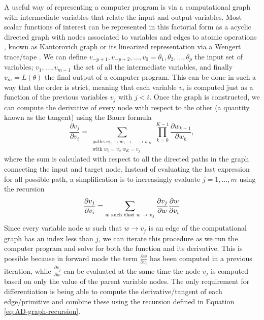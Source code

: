 A useful way of representing a computer program is via a computational graph with intermediate variables that relate the input and output variables. 
Most scalar functions of interest can be represented in this factorial form as a acyclic directed graph with nodes associated to variables and edges to atomic operations \cite{Griewank:2008kh, Griewank_1989}, known as Kantorovich graph \cite{kantorovich1957mathematical} or its linearized representation via a Wengert trace/tape \cite{Wengert_1964, Bauer_1974, Griewank:2008kh}. 
We can define $v_{-p+1}, v_{-p+2}, \ldots, v_0 = \theta_1, \theta_2, \ldots, \theta_p$ the input set of variables; $v_{1}, \ldots, v_{m-1}$ the set of all the intermediate variables, and finally $v_m = L(\theta)$ the final output of a computer program. 
This can be done in such a way that the order is strict, meaning that each variable $v_i$ is computed just as a function of the previous variables $v_j$ with $j < i$. 
Once the graph is constructed, we can compute the derivative of every node with respect to the other (a quantity known as the tangent) using the Bauer formula \cite{Bauer_1974, Oktay_randomized-AD}
\begin{equation}
    \frac{\partial v_j}{\partial v_i}
    = 
    \sum_{\substack{ \text{paths }w_0 \rightarrow w_1 \rightarrow \ldots \rightarrow w_K \\
                    \text{with } w_0=v_i, w_K = v_j}}
    \prod_{k=0}^{K-1} \frac{\partial w_{k+1}}{\partial w_{k}},
\end{equation}
where the sum is calculated with respect to all the directed paths in the graph connecting the input and target node.
Instead of evaluating the last expression for all possible path, a simplification is to increasingly evaluate $j=1, \ldots, m$ using the recursion 
\begin{equation}
    \frac{\partial v_j}{\partial v_i}
    = 
    \sum_\text{$w$\text{ such that} $w \rightarrow v_j$}
    \frac{\partial v_j}{\partial w}
    \frac{\partial w}{\partial v_i} 
    \label{eq:AD-graph-recursion}
\end{equation}
Since every variable node $w$ such that $w \rightarrow v_j$ is an edge of the computational graph has an index less than $j$, we can iterate this procedure as we run the computer program and solve for both the function and its derivative.
This is possible because in forward mode the term $\frac{\partial w}{\partial v_i}$ has been computed in a previous iteration, while $\frac{\partial v_j}{\partial w}$ can be evaluated at the same time the node $v_j$ is computed based on only the value of the parent variable nodes. 
The only requirement for differentiation is being able to compute the derivative/tangent of each edge/primitive and combine these using the recursion defined in Equation \eqref{eq:AD-graph-recursion}.

